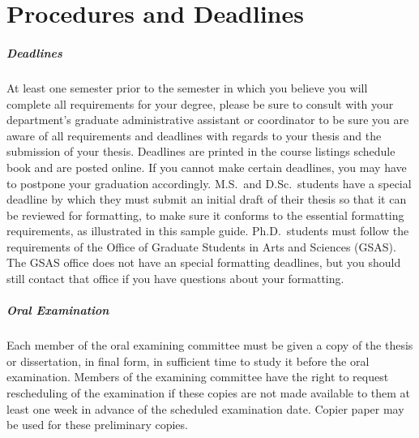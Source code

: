 \chapter{Procedures and Deadlines}
\label{app:procedures}

\paragraph{Deadlines}
At least one semester prior to the semester in which you believe you will
complete all requirements for your degree, please be sure to consult with your
department's graduate administrative assistant or coordinator to be sure you
are aware of all requirements and deadlines with regards to your thesis and the
submission of your thesis.  Deadlines are printed in the course listings
schedule book and are posted online.  If you cannot make certain deadlines, you
may have to postpone your graduation accordingly.  M.S.\ and D.Sc.\ students
have a special deadline by which they must submit an initial draft of their
thesis so that it can be reviewed for formatting, to make sure it conforms to
the essential formatting requirements, as illustrated in this sample guide.
Ph.D.\ students must follow the requirements of the Office of Graduate Students
in Arts and Sciences (GSAS).  The GSAS office does not have an special
formatting deadlines, but you should still contact that office if you have
questions about your formatting.

\paragraph{Oral Examination}
Each member of the oral examining committee must be given a copy of the thesis
or dissertation, in final form, in sufficient time to study it before the oral
examination.  Members of the examining committee have the right to request
rescheduling of the examination if these copies are not made available to them
at least one week in advance of the scheduled examination date.  Copier paper
may be used for these preliminary copies.

